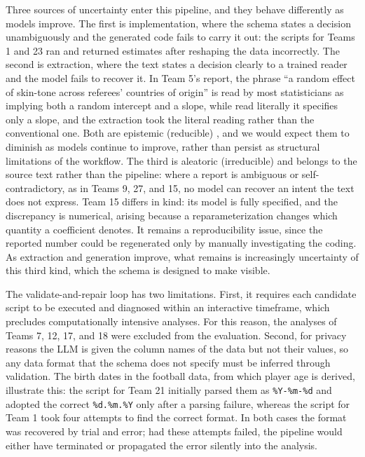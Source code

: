 \documentclass[aoas]{imsart}
\begin{document}
Three sources of uncertainty enter this pipeline, and they behave
differently as models improve. The first is implementation, where the
schema states a decision unambiguously and the generated code fails to
carry it out: the scripts for Teams 1 and 23 ran and returned estimates
after reshaping the data incorrectly. The second is extraction, where
the text states a decision clearly to a trained reader and the model
fails to recover it. In Team 5's report, the phrase ``a random effect of
skin-tone across referees' countries of origin'' is read by most
statisticians as implying both a random intercept and a slope, while
read literally it specifies only a slope, and the extraction took the
literal reading rather than the conventional one. Both are epistemic
(reducible) \citep{kendall2017, hullermeier2021}, and we would expect
them to diminish as models continue to improve, rather than persist as
structural limitations of the workflow. The third is aleatoric
(irreducible) and belongs to the source text rather than the pipeline:
where a report is ambiguous or self-contradictory, as in Teams 9, 27,
and 15, no model can recover an intent the text does not express. Team
15 differs in kind: its model is fully specified, and the discrepancy is
numerical, arising because a reparameterization changes which quantity a
coefficient denotes. It remains a reproducibility issue, since the
reported number could be regenerated only by manually investigating the
coding. As extraction and generation improve, what remains is
increasingly uncertainty of this third kind, which the schema is
designed to make visible.

The validate-and-repair loop has two limitations. First, it requires
each candidate script to be executed and diagnosed within an interactive
timeframe, which precludes computationally intensive analyses. For this
reason, the analyses of Teams 7, 12, 17, and 18 were excluded from the
evaluation. Second, for privacy reasons the LLM is given the column
names of the data but not their values, so any data format that the
schema does not specify must be inferred through validation. The birth
dates in the football data, from which player age is derived, illustrate
this: the script for Team 21 initially parsed them as
\texttt{\%Y-\%m-\%d} and adopted the correct \texttt{\%d.\%m.\%Y} only
after a parsing failure, whereas the script for Team 1 took four
attempts to find the correct format. In both cases the format was
recovered by trial and error; had these attempts failed, the pipeline
would either have terminated or propagated the error silently into the
analysis.
\end{document}
